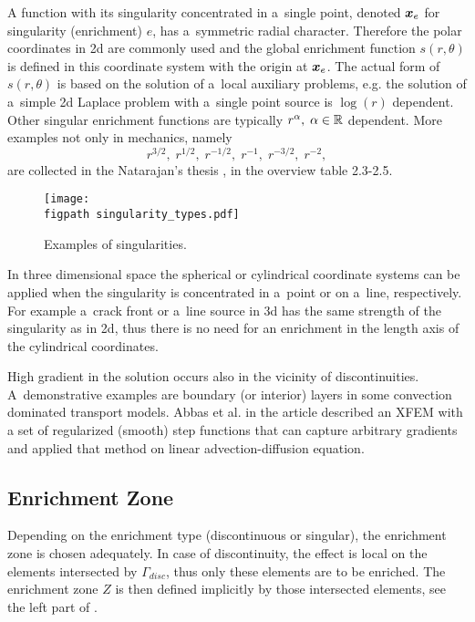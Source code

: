 A function with its singularity concentrated in a~single point, denoted $\mathbf{\boldsymbol{x}}_e$ for singularity (enrichment) $e$, has a~symmetric radial character.
Therefore the polar coordinates in 2d are commonly used and the global enrichment function $s(r,\theta)$ is defined in this coordinate system with the origin at $\mathbf{\boldsymbol{x}}_e$.
The actual form of $s(r,\theta)$ is based on the solution of a~local auxiliary problems, e.g. the solution of a~simple 2d Laplace problem with a~single point source 
is $\log(r)$ dependent. Other singular enrichment functions are typically $r^\alpha,\;\alpha\in\mathbb{R}$ dependent.
More examples not only in mechanics, namely
\[ r^{3/2},\;r^{1/2},\;r^{-1/2},\;r^{-1},\;r^{-3/2},\; r^{-2}, \]
are collected in the Natarajan's thesis \cite{natarajan_enriched_2011}, in the overview table 2.3-2.5.
%
\begin{figure}[!htb]
  \centering    
    \texttt{[image: \\figpath singularity\_types.pdf]}
  \caption{Examples of singularities.}
  \label{fig:types_of_singularities}
\end{figure}

In three dimensional space the spherical or cylindrical coordinate systems can be applied when the singularity is concentrated in a~point or on a~line, respectively.
For example a~crack front or a~line source in 3d has the same strength of the singularity as in 2d, thus there is no need for an enrichment in the length axis
of the cylindrical coordinates.

High gradient in the solution occurs also in the vicinity of discontinuities. A~de\-mon\-strative examples are boundary (or interior) layers
in some convection dominated transport models. Abbas et al. in the article \cite{abbas_alizada_fries_highgradient_2010} described an XFEM with
a set of regularized (smooth) step functions that can capture arbitrary gradients and applied that method on linear advection-diffusion equation.

\subsection{Enrichment Zone} \label{sec:glob_enr_zone}
Depending on the enrichment type (discontinuous or singular), the enrichment zone is chosen adequately.
In case of discontinuity, the effect is local on the elements intersected by $\Gamma_{disc}$, thus only
these elements are to be enriched. The enrichment zone $Z$ is then defined implicitly by those intersected elements,
see the left part of .

